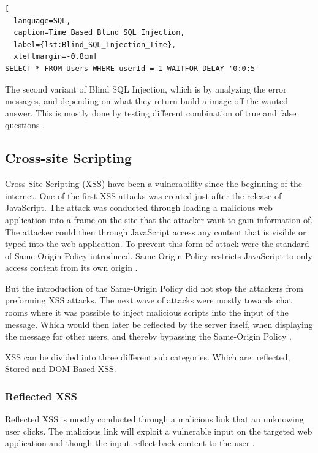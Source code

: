 \hfill
\begin{lstlisting}[
  language=SQL,
  caption=Time Based Blind SQL Injection,
  label={lst:Blind_SQL_Injection_Time},
  xleftmargin=-0.8cm]
SELECT * FROM Users WHERE userId = 1 WAITFOR DELAY '0:0:5'
\end{lstlisting}
\hfill

The second variant of Blind SQL Injection, which is by analyzing the error messages, and depending on what they return build a image off the wanted answer. This is mostly done by testing different combination of true and false questions \parencite{JustinClarke-Salt2009SIAa, Secure_Web}.


\subsection{Cross-site Scripting}
Cross-Site Scripting (XSS) have been a vulnerability since the beginning of the internet. One of the first XSS attacks was created just after the release of JavaScript. The attack was conducted through loading a malicious web application into a frame on the site that the attacker want to gain information of. The attacker could then through JavaScript access any content that is visible or typed into the web application. To prevent this form of attack were the standard of Same-Origin Policy introduced. Same-Origin Policy restricts JavaScript to only access content from its own origin \parencite{FogieSeth2007Xacs, w3csop}.

But the introduction of the Same-Origin Policy did not stop the attackers from preforming XSS attacks. The next wave of attacks were mostly towards chat rooms where it was possible to inject malicious scripts into the input of the message. Which would then later be reflected by the server itself, when displaying the message for other users, and thereby bypassing the Same-Origin Policy \parencite{FogieSeth2007Xacs}.

XSS can be divided into three different sub categories. Which are: reflected, Stored and DOM Based XSS.

\subsubsection{Reflected XSS}
Reflected XSS is mostly conducted through a malicious link that an unknowing user clicks. The malicious link will exploit a vulnerable input on the targeted web application and though the input reflect back content to the user \parencite{Secure_Web}.


